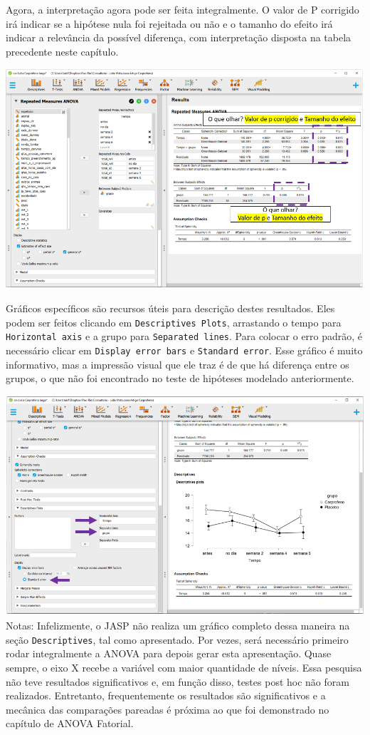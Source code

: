 \documentclass[
]{book}
\begin{document}
Agora, a interpretação agora pode ser feita integralmente. O valor de P corrigido irá indicar se a hipótese nula foi rejeitada ou não e o tamanho do efeito irá indicar a relevância da possível diferença, com interpretação disposta na tabela precedente neste capítulo.

\includegraphics{./img/cap_anovarm_interpretacao.png}

Gráficos específicos são recursos úteis para descrição destes resultados. Eles podem ser feitos clicando em \texttt{Descriptives\ Plots}, arrastando o tempo para \texttt{Horizontal\ axis} e a grupo para \texttt{Separated\ lines}. Para colocar o erro padrão, é necessário clicar em \texttt{Display\ error\ bars} e \texttt{Standard\ error}. Esse gráfico é muito informativo, mas a impressão visual que ele traz é de que há diferença entre os grupos, o que não foi encontrado no teste de hipóteses modelado anteriormente.

\includegraphics{./img/cap_anovarm_grafico.png}
Notas: Infelizmente, o JASP não realiza um gráfico completo dessa maneira na seção \texttt{Descriptives}, tal como apresentado. Por vezes, será necessário primeiro rodar integralmente a ANOVA para depois gerar esta apresentação. Quase sempre, o eixo X recebe a variável com maior quantidade de níveis. Essa pesquisa não teve resultados significativos e, em função disso, testes post hoc não foram realizados. Entretanto, frequentemente os resultados são significativos e a mecânica das comparações pareadas é próxima ao que foi demonstrado no capítulo de ANOVA Fatorial.
\end{document}
